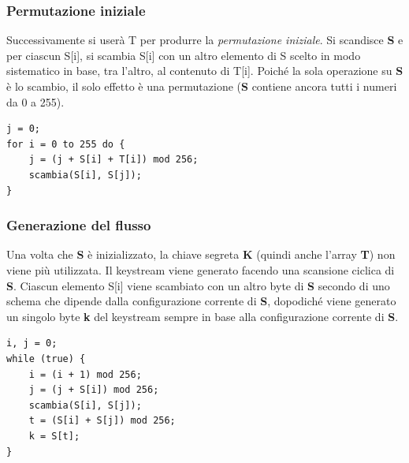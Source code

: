 \subsubsection{Permutazione iniziale}
Successivamente si userà T per produrre la \textit{permutazione iniziale}. Si scandisce \textbf{S} e per ciascun S[i], si scambia S[i] con un altro elemento di S scelto in modo sistematico in base, tra l'altro, al contenuto di T[i]. Poiché la sola operazione su \textbf{S} è lo scambio, il solo effetto è una permutazione (\textbf{S} contiene ancora tutti i numeri da 0 a 255).

\begin{algorithm}
\begin{lstlisting}[caption={Permutazione iniziale RC4}]
j = 0;
for i = 0 to 255 do {
	j = (j + S[i] + T[i]) mod 256;
	scambia(S[i], S[j]);
}
\end{lstlisting}
\end{algorithm}

\subsubsection{Generazione del flusso}
Una volta che \textbf{S} è inizializzato, la chiave segreta \textbf{K} (quindi anche l'array \textbf{T}) non viene più utilizzata. Il keystream viene generato facendo una
scansione ciclica di \textbf{S}. Ciascun elemento S[i] viene scambiato con un altro byte di \textbf{S} secondo di uno schema che dipende dalla configurazione corrente di \textbf{S}, dopodiché viene generato un singolo byte \textbf{k} del keystream sempre in base alla configurazione corrente di \textbf{S}.

\begin{algorithm}
\begin{lstlisting}[caption={Generazione flusso}]
i, j = 0;
while (true) {
	i = (i + 1) mod 256;
	j = (j + S[i]) mod 256;
	scambia(S[i], S[j]);
	t = (S[i] + S[j]) mod 256;
	k = S[t];
}
\end{lstlisting}
\end{algorithm}